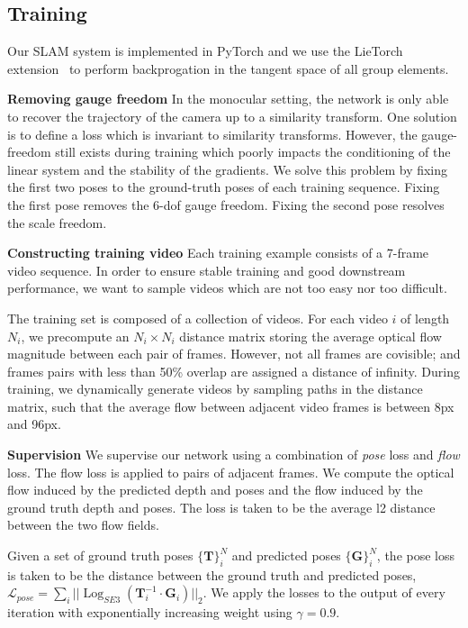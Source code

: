 \documentclass{article}
\DeclareMathOperator{\Log}{Log}
\begin{document}
\subsection{Training}
\vspace{-1mm}
Our SLAM system is implemented in PyTorch and we use the LieTorch extension~\cite{teed2021tangent} to perform backprogation in the tangent space of all group elements.

\noindent \textbf{Removing gauge freedom} In the monocular setting, the network is only able to recover the trajectory of the camera up to a similarity transform. One solution is to define a loss which is invariant to similarity transforms. However, the gauge-freedom still exists during training which poorly impacts the conditioning of the linear system and the stability of the gradients. We solve this problem by fixing the first two poses to the ground-truth poses of each training sequence. Fixing the first pose removes the 6-dof gauge freedom. Fixing the second pose resolves the scale freedom.

\noindent \textbf{Constructing training video} Each training example consists of a 7-frame video sequence. In order to ensure stable training and good downstream performance, we want to sample videos which are not too easy nor too difficult.

The training set is composed of a collection of videos. For each video $i$ of length $N_i$, we precompute an $N_i\times N_i$ distance matrix storing the average optical flow magnitude between each pair of frames. However, not all frames are covisible; and frames pairs with less than 50\% overlap are assigned a distance of infinity. During training, we dynamically generate videos by sampling paths in the distance matrix, such that the average flow between adjacent video frames is between 8px and 96px.

\noindent \textbf{Supervision} We supervise our network using a combination of \emph{pose} loss and \emph{flow} loss. The flow loss is applied to pairs of adjacent frames. We compute the optical flow induced by the predicted depth and poses and the flow induced by the ground truth depth and poses. The loss is taken to be the average l2 distance between the two flow fields.

Given a set of ground truth poses $\{\mathbf{T}\}_i^N$ and predicted poses $\{\mathbf{G}\}_i^N$, the pose loss is taken to be the distance
between the ground truth and predicted poses, $\mathcal{L}_{pose} = \sum_i || \Log_{SE3}(\mathbf{T}_i^{-1} \cdot \mathbf{G}_i) ||_2$.  We apply the losses to the output of every iteration with exponentially increasing weight using $\gamma=0.9$.
\end{document}
